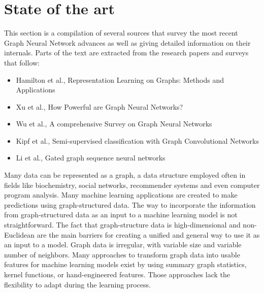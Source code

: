 \newpage
\section{State of the art}


This section is a compilation of several sources that survey the most recent Graph Neural Network advances as well as giving detailed information on their internals. Parts of the text are extracted from the research papers and surveys that follow:
\begin{itemize}
	\item Hamilton et al., Representation Learning on Graphs: Methods and Applications \cite{hamilton} %
	\item Xu et al., How Powerful are Graph Neural Networks? \cite{powerful}%
	\item Wu et al., A comprehensive Survey on Graph Neural Networks \cite{wu}%
	\item Kipf et al., Semi-supervised classification with Graph Convolutional Networks \cite{gcn} %
	\item Li et al., Gated graph sequence neural networks \cite{ggnn} %
\end{itemize}


Many data can be represented as a graph, a data structure employed often in fields like biochemistry, social networks, recommender systems and even computer program analysis. Many machine learning applications are created to make predictions using graph-structured data. The way to incorporate the information from graph-structured data as an input to a machine learning model is not straightforward. The fact that graph-structure data is high-dimensional and non-Euclidean are the main barriers for creating a unified and general way to use it as an input to a model. Graph data is irregular, with variable size and variable number of neighbors. Many approaches to transform graph data into usable features for machine learning models exist by using summary graph statistics, kernel functions, or hand-engineered features. Those approaches lack the flexibility to adapt during the learning process.



